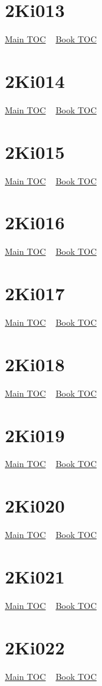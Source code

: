 \documentclass{book}
\begin{document}
  \section{2Ki013}\hyperlink{toc}{Main TOC} ~ \hyperref[subsec:2Ki]{Book TOC} 
  \section{2Ki014}\hyperlink{toc}{Main TOC} ~ \hyperref[subsec:2Ki]{Book TOC} 
  \section{2Ki015}\hyperlink{toc}{Main TOC} ~ \hyperref[subsec:2Ki]{Book TOC} 
  \section{2Ki016}\hyperlink{toc}{Main TOC} ~ \hyperref[subsec:2Ki]{Book TOC} 
  \section{2Ki017}\hyperlink{toc}{Main TOC} ~ \hyperref[subsec:2Ki]{Book TOC} 
  \section{2Ki018}\hyperlink{toc}{Main TOC} ~ \hyperref[subsec:2Ki]{Book TOC} 
  \section{2Ki019}\hyperlink{toc}{Main TOC} ~ \hyperref[subsec:2Ki]{Book TOC} 
  \section{2Ki020}\hyperlink{toc}{Main TOC} ~ \hyperref[subsec:2Ki]{Book TOC} 
  \section{2Ki021}\hyperlink{toc}{Main TOC} ~ \hyperref[subsec:2Ki]{Book TOC} 
  \section{2Ki022}\hyperlink{toc}{Main TOC} ~ \hyperref[subsec:2Ki]{Book TOC} 
\end{document}
